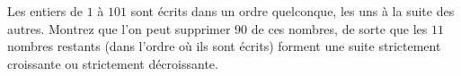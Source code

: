 Les entiers de $1$ à $101$ sont écrits dans un ordre quelconque, les uns à
la suite des autres. Montrez que l'on peut supprimer $90$ de ces nombres, de
sorte que les $11$ nombres restants (dans l'ordre où ils sont écrits)
forment une suite strictement croissante ou strictement décroissante.
